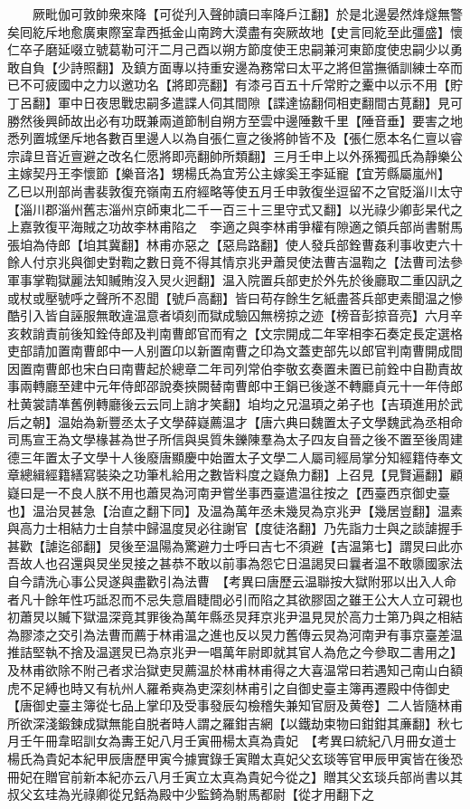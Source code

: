 　　厥毗伽可敦帥衆來降【可從刋入聲帥讀曰率降戶江翻】於是北邊晏然烽燧無警矣囘紇斥地愈廣東際室韋西抵金山南跨大漠盡有突厥故地【史言囘紇至此彊盛】懷仁卒子磨延啜立號葛勒可汗二月己酉以朔方節度使王忠嗣兼河東節度使忠嗣少以勇敢自負【少詩照翻】及鎮方面專以持重安邊為務常曰太平之將但當撫循訓練士卒而已不可疲國中之力以邀功名【將即亮翻】有漆弓百五十斤常貯之櫜中以示不用【貯丁呂翻】軍中日夜思戰忠嗣多遣諜人伺其間隙【諜達協翻伺相吏翻間古莧翻】見可勝然後興師故出必有功既兼兩道節制自朔方至雲中邊陲數千里【陲音垂】要害之地悉列置城堡斥地各數百里邊人以為自張仁亶之後將帥皆不及【張仁愿本名仁亶以睿宗諱旦音近亶避之改名仁愿將即亮翻帥所類翻】三月壬申上以外孫獨孤氏為靜樂公主嫁契丹王李懷節【樂音洛】甥楊氏為宜芳公主嫁奚王李延寵【宜芳縣屬嵐州】　乙巳以刑部尚書裴敦復充嶺南五府經略等使五月壬申敦復坐逗留不之官貶淄川太守【淄川郡淄州舊志淄州京師東北二千一百三十三里守式又翻】以光祿少卿彭杲代之上嘉敦復平海賊之功故李林甫陷之　李適之與李林甫爭權有隙適之領兵部尚書駙馬張垍為侍郎【垍其冀翻】林甫亦惡之【惡烏路翻】使人發兵部銓曹姦利事收吏六十餘人付京兆與御史對鞫之數日竟不得其情京兆尹蕭炅使法曹吉温鞫之【法曹司法參軍事掌鞫獄麗法知贓賄沒入炅火迥翻】温入院置兵部吏於外先於後廳取二重囚訊之或杖或壓號呼之聲所不忍聞【號戶高翻】皆曰苟存餘生乞紙盡荅兵部吏素聞温之慘酷引入皆自誣服無敢違温意者頃刻而獄成驗囚無榜掠之迹【榜音彭掠音亮】六月辛亥敕誚責前後知銓侍郎及判南曹郎官而宥之【文宗開成二年宰相李石奏定長定選格吏部請加置南曹郎中一人别置卬以新置南曹之印為文蓋吏部先以郎官判南曹開成間因置南曹郎也宋白曰南曹起於總章二年司列常伯李敬玄奏置未置已前銓中自勘責故事兩轉廳至建中元年侍郎邵說奏挾闕替南曹郎中王鋗已後遂不轉廳貞元十一年侍郎杜黄裳請凖舊例轉廳後云云同上誚才笑翻】垍均之兄温頊之弟子也【吉頊進用於武后之朝】温始為新豐丞太子文學薛嶷薦温才【唐六典曰魏置太子文學魏武為丞相命司馬宣王為文學椽甚為世子所信與吳質朱鑠陳羣為太子四友自晉之後不置至後周建德三年置太子文學十人後廢唐顯慶中始置太子文學二人屬司經局掌分知經籍侍奉文章總緝經籍繕寫裝染之功筆札給用之數皆料度之嶷魚力翻】上召見【見賢遍翻】顧嶷曰是一不良人朕不用也蕭炅為河南尹嘗坐事西臺遣温往按之【西臺西京御史臺也】温治炅甚急【治直之翻下同】及温為萬年丞未幾炅為京兆尹【幾居豈翻】温素與高力士相結力士自禁中歸温度炅必往謝官【度徒洛翻】乃先詣力士與之談謔握手甚歡【謔迄郤翻】炅後至温陽為驚避力士呼曰吉七不須避【吉温第七】謂炅曰此亦吾故人也召還與炅坐炅接之甚恭不敢以前事為怨它日温謁炅曰曩者温不敢隳國家法自今請洗心事公炅遂與盡歡引為法曹　【考異曰唐歷云温聯按大獄附邪以出入人命者凡十餘年性巧詆忍而不忌失意眉睫間必引而陷之其欲膠固之雖王公大人立可親也初蕭炅以贓下獄温深竟其罪後為萬年縣丞炅拜京兆尹温見炅於高力士第乃與之相結為膠漆之交引為法曹而薦于林甫温之進也反以炅力舊傳云炅為河南尹有事京臺差温推詰堅執不捨及温選炅已為京兆尹一唱萬年尉即就其官人為危之今參取二書用之】及林甫欲除不附己者求治獄吏炅薦温於林甫林甫得之大喜温常曰若遇知己南山白額虎不足縛也時又有杭州人羅希奭為吏深刻林甫引之自御史臺主簿再遷殿中侍御史【唐御史臺主簿從七品上掌印及受事發辰勾檢稽失兼知官厨及黄卷】二人皆隨林甫所欲深淺鍛鍊成獄無能自脱者時人謂之羅鉗吉網【以鐵劫束物曰鉗鉗其亷翻】秋七月壬午冊韋昭訓女為夀王妃八月壬寅冊楊太真為貴妃　【考異曰統紀八月冊女道士楊氏為貴妃本紀甲辰唐歷甲寅今據實錄壬寅贈太真妃父玄琰等官甲辰甲寅皆在後恐冊妃在贈官前新本紀亦云八月壬寅立太真為貴妃今從之】贈其父玄琰兵部尚書以其叔父玄珪為光祿卿從兄銛為殿中少監錡為駙馬都尉【從才用翻下之